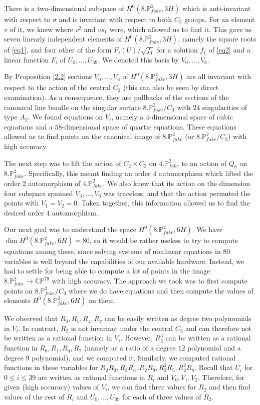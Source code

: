\documentclass[11pt,reqno]{amsart}
\def\C {{\mathbb C}}
\def\P {{\mathbb P}}
\def\FPP {{\P^2_{fake}}}
\theoremstyle{definition}
\numberwithin{equation}{section}
\begin{document}
\medskip
There is a two-dimensional subspace of $H^0(8.\FPP,3H)$ which is anti-invariant with respect to $\sigma$ and is invariant with respect to both $C_3$ groups. For an element $v$ of it, we knew where $v^2$ and $v s_1$ were, which allowed us to find it. This gave us seven linearly independent elements of $H^0(8.\FPP,3H)$, namely the square roots of \eqref{eq1}, and four other of the form $F_i(U)/\sqrt{f_1}$ for a solution $f_1$ of \eqref{eq2} and a linear function $F_i$ of $U_0,\ldots, U_{39}$. We denoted this basis by $V_0,\ldots, V_6$.


\medskip
By Proposition \ref{2.2}  sections $V_0,\ldots, V_6$ of $H^0(8.\FPP,3H)$ are all invariant with respect to the action of the central $C_3$ (this can also be seen by direct examination). As a consequence, they are pullbacks of the sections of the canonical line bundle on the singular surface $8.\FPP/C_3$ with $24$ singularities of type $A_2$. 
We found equations on $V_i$, namely a $4$-dimensional space of cubic equations and a $58$-dimensional space of quartic equations. These equations allowed us to find points on
the canonical image of $8.\FPP$ (or $8.\FPP/C_3$)  with high accuracy.

\medskip
The next step was to lift the action of $C_2\times C_2$ on $4.\FPP$ to an action of $Q_8$ on $8.\FPP$.
Specifically, this meant finding an order $4$ automorphism which lifted the order $2$ automorphism of $4.\FPP$. We also knew that its action on the dimension four subspace spanned $V_3,\ldots,V_6$ was traceless, and that the action permuted the points with $V_1=V_2=0$. Taken together, this information allowed us to find the desired order $4$ automorphism.


\medskip
Our next goal was to understand the space $H^0(8.\FPP, 6H)$.
We have $\dim H^0(8.\FPP, 6H)=80$, so it would be rather useless to try to compute equations among these, since solving systems of nonlinear equations in $80$ variables is well beyond the capabilities of our available hardware. Instead, we had to settle for being able to compute a lot of points in the image  $8.\FPP\to \C\P^{79}$ with high accuracy. The approach we took was to first compute points on  
$8.\FPP/C_3$ where we do have equations and then compute the values of elements $H^0(8.\FPP,6H)$ on them. 


\medskip
We observed that $R_0,R_1,R_4,R_7$ can be easily written as degree two polynomials in $V_i$. In contrast, $R_2$ is not invariant under the central $C_3$ and can therefore not be written as a rational function in $V_i$. However, $R_2^3$ can  be written as a rational function in $R_0,R_1,R_4,R_7$ (namely as a ratio of a degree $12$ polynomial and a degree $9$ polynomial), and we computed it. Similarly, we computed rational functions in these variables for $R_2R_3,R_2R_6,R_2R_9,R_2^2R_5,R_2^2R_8$. Recall that $U_i$ for $0\leq i \leq 39$ are written as rational functions in $R_i$ and $V_0,V_1,V_2$. 
Therefore, for given (high accuracy) values of $V_i$, we can find three values for $R_2$ and then find values of the rest of $R_i$ and $U_0,\ldots,U_{39}$ for each of three values of $R_2$. 
\end{document}
